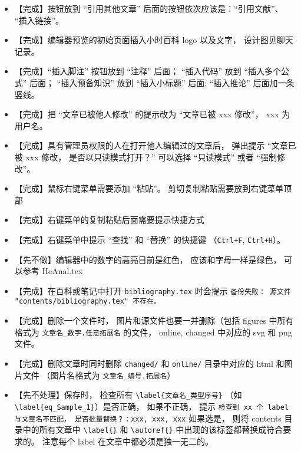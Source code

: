 \begin{itemize}
\item 【完成】按钮放到 “引用其他文章” 后面的按钮依次应该是：“引用文献”、 “插入链接”。

\item 【完成】编辑器预览的初始页面插入小时百科 logo 以及文字， 设计图见聊天记录。

\item 【完成】“插入脚注” 按钮放到 “注释” 后面； “插入代码” 放到 “插入多个公式” 后面； “插入预备知识” 放到 “插入小标题” 后面; “插入推论” 后面加一条竖线。

\item 【完成】把 “文章已被他人修改” 的提示改为 “文章已被 xxx 修改”， xxx 为用户名。

\item 【完成】具有管理员权限的人在打开他人编辑过的文章后， 弹出提示 “文章已被 xxx 修改， 是否以只读模式打开？” 可以选择 “只读模式” 或者 “强制修改”。

\item 【完成】鼠标右键菜单需要添加 “粘贴”。 剪切复制粘贴需要放到右键菜单顶部

\item 【完成】右键菜单的复制粘贴后面需要提示快捷方式

\item 【完成】右键菜单中提示 “查找” 和 “替换” 的快捷键 （\verb`Ctrl+F`, \verb`Ctrl+H`）。

\item 【先不做】编辑器中的数字的高亮目前是红色， 应该和字母一样是绿色， 可以参考 HeAnal.tex

\item 【完成】在百科或笔记中打开 \verb`bibliography.tex` 时会提示 \verb`备份失败： 源文件 "contents/bibliography.tex" 不存在。`

\item 【完成】删除一个文件时， 图片和源文件也要一并删除（包括 figures 中所有格式为 \verb`文章名_数字.任意拓展名` 的文件， online, changed 中对应的 svg 和 png 文件。

\item 【完成】删除文章时同时删除 \verb`changed/` 和 \verb`online/` 目录中对应的 html 和图片文件 （图片名格式为 \verb`文章名_编号.拓展名`）

\item 【先不处理】保存时， 检查所有 \verb`\label{文章名_类型序号}` （如 \verb`\label{eq_Sample_1}`）是否正确， 如果不正确， 提示 \verb`检查到 xx 个 label 与文章名不匹配， 是否批量替换？：xxx, xxx, xxx` 如果选是， 则将 contents 目录中的所有文章中 \verb`\label{}` 和 \verb`\autoref{}` 中出现的该标签都替换成符合要求的。 注意每个 label 在文章中都必须是独一无二的。


\end{itemize}
